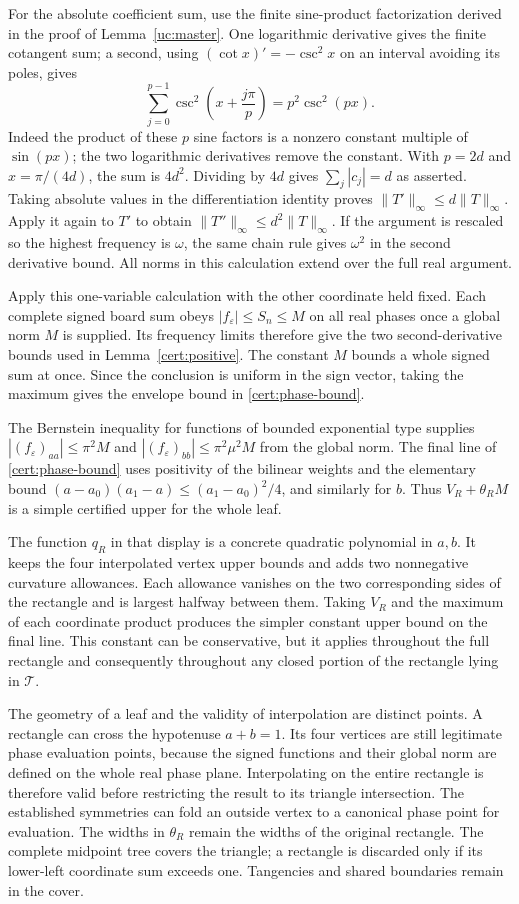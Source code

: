For the absolute coefficient sum, use the finite sine-product
factorization derived in the proof of Lemma~\ref{uc:master}.
One logarithmic derivative gives the finite cotangent sum; a second,
using $(\cot x)'=-\csc^2x$ on an interval avoiding its poles, gives
\[
 \sum_{j=0}^{p-1}\csc^2\left(x+\frac{j\pi}{p}\right)
       =p^2\csc^2(px).
\]
Indeed the product of these $p$ sine factors is a nonzero constant
multiple of $\sin(px)$; the two logarithmic derivatives remove the
constant. With $p=2d$ and $x=\pi/(4d)$, the sum is $4d^2$.
Dividing by $4d$ gives $\sum_j|c_j|=d$ as asserted. Taking
absolute values in the differentiation identity proves
$\|T'\|_\infty\leq d\|T\|_\infty$. Apply it again to $T'$
to obtain $\|T''\|_\infty\leq d^2\|T\|_\infty$.
If the argument is rescaled so the highest frequency is $\omega$,
the same chain rule gives $\omega^2$ in the second derivative bound.
All norms in this calculation extend over the full real argument.

Apply this one-variable calculation with the other coordinate held
fixed. Each complete signed board sum obeys
$|f_\varepsilon|\leq S_n\leq M$ on all real phases once a global
norm $M$ is supplied. Its frequency limits therefore give the two
second-derivative bounds used in Lemma~\ref{cert:positive}. The
constant $M$ bounds a whole signed sum at once. Since the conclusion
is uniform in the sign vector, taking the maximum gives the envelope
bound in \eqref{cert:phase-bound}.

The Bernstein inequality for functions of bounded exponential type
\cite{Boas1954} supplies
$|(f_\varepsilon)_{aa}|\leq\pi^2M$ and
$|(f_\varepsilon)_{bb}|\leq\pi^2\mu^2M$ from the global norm.
The final line of \eqref{cert:phase-bound} uses positivity of the
bilinear weights and the elementary bound
$(a-a_0)(a_1-a)\leq(a_1-a_0)^2/4$, and similarly for $b$.
Thus $V_R+\theta_RM$ is a simple certified upper for the whole leaf.

The function $q_R$ in that display is a concrete quadratic polynomial
in $a,b$. It keeps the four interpolated vertex upper bounds and adds
two nonnegative curvature allowances. Each allowance vanishes on the
two corresponding sides of the rectangle and is largest halfway
between them. Taking $V_R$ and the maximum of each coordinate product
produces the simpler constant upper bound on the final line. This
constant can be conservative, but it applies throughout the full
rectangle and consequently throughout any closed portion of the
rectangle lying in $\mathcal T$.

The geometry of a leaf and the validity of interpolation are distinct
points. A rectangle can cross the hypotenuse $a+b=1$. Its four
vertices are still legitimate phase evaluation points, because the
signed functions and their global norm are defined on the whole
real phase plane. Interpolating on the entire rectangle is therefore
valid before restricting the result to its triangle intersection.
The established symmetries can fold an outside vertex to a canonical
phase point for evaluation. The widths in $\theta_R$ remain the
widths of the original rectangle.
The complete midpoint tree covers the triangle; a rectangle
is discarded only if its lower-left coordinate sum exceeds one.
Tangencies and shared boundaries remain in the cover.

